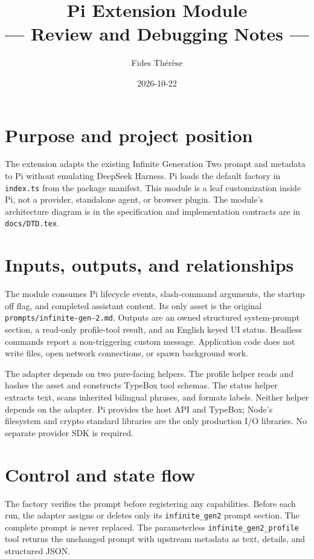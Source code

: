 \documentclass[10pt]{ltjsarticle}
\begin{document}
\title{Pi Extension Module\\\large{--- Review and Debugging Notes ---}}
\author{Fides Thérèse}
\date{2026-10-22}
\maketitle
\thispagestyle{plain}

\section{Purpose and project position}
The extension adapts the existing Infinite Generation Two prompt and metadata
to Pi without emulating DeepSeek Harness. Pi loads the default factory in
\texttt{index.ts} from the package manifest. This module is a leaf customization
inside Pi, not a provider, standalone agent, or browser plugin. The module's
architecture diagram is in the specification and implementation contracts
are in \texttt{docs/DTD.tex}.

\section{Inputs, outputs, and relationships}
The module consumes Pi lifecycle events, slash-command arguments, the startup
off flag, and completed assistant content. Its only asset is the original
\texttt{prompts/infinite-gen-2.md}. Outputs are an owned structured system-prompt
section, a read-only profile-tool result, and an English keyed UI status.
Headless commands report a non-triggering custom message. Application code
does not write files, open network connections, or spawn background work.

The adapter depends on two pure-facing helpers. The profile helper reads and
hashes the asset and constructs TypeBox tool schemas. The status helper
extracts text, scans inherited bilingual phrases, and formats labels. Neither
helper depends on the adapter. Pi provides the host API and TypeBox; Node's
filesystem and crypto standard libraries are the only production I/O
libraries. No separate provider SDK is required.

\section{Control and state flow}
The factory verifies the prompt before registering any capabilities. Before
each run, the adapter assigns or deletes only its \texttt{infinite\_gen2}
prompt section. The complete prompt is never replaced. The parameterless
\texttt{infinite\_gen2\_profile} tool returns the unchanged prompt with upstream
metadata as text, details, and structured JSON.
\end{document}
